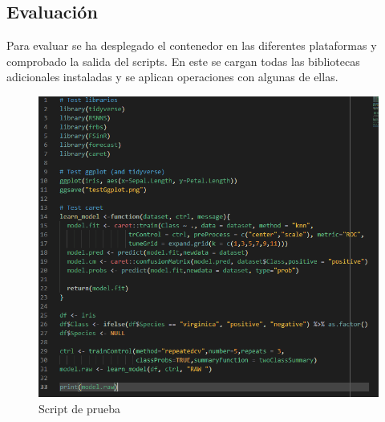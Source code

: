 \subsection{Evaluación}

Para evaluar se ha desplegado el contenedor en las diferentes plataformas y comprobado la salida del scripts. En este se cargan todas las bibliotecas adicionales instaladas y se aplican operaciones con algunas de ellas.

\begin{figure}[H]\center\includegraphics[width=.95\linewidth]{img/r/r9.png}\caption{Script de prueba}\end{figure}